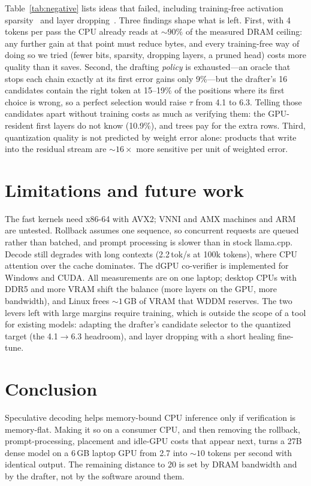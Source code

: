 \documentclass[10pt]{article}
\newcommand{\tps}{tok/s}
\begin{document}
Table~\ref{tab:negative} lists ideas that failed, including training-free activation sparsity~\cite{teal} and
layer dropping~\cite{shortgpt}. Three findings shape what is left. First, with 4 tokens per pass the
CPU already reads at ${\sim}90\%$ of the measured DRAM ceiling: any further gain at that point must reduce bytes, and
every training-free way of doing so we tried (fewer bits, sparsity, dropping layers, a pruned head) costs more quality
than it saves. Second, the drafting \emph{policy} is exhausted---an oracle that stops each chain exactly at its first
error gains only 9\%---but the drafter's 16 candidates contain the right token at 15--19\% of the positions where its
first choice is wrong, so a perfect selection would raise $\tau$ from 4.1 to 6.3. Telling those candidates apart
without training costs as much as verifying them: the GPU-resident first layers do not know (10.9\%), and trees pay for
the extra rows. Third, quantization quality is not predicted by weight error alone: products that write into the
residual stream are ${\sim}16\times$ more sensitive per unit of weighted error.

\section{Limitations and future work}

The fast kernels need x86-64 with AVX2; VNNI and AMX machines and ARM are untested. Rollback assumes one sequence,
so concurrent requests are queued rather than batched, and prompt processing is slower than in stock llama.cpp.
Decode still degrades with long contexts (2.2\,\tps{} at 100k tokens), where CPU attention over the cache
dominates.
The dGPU co-verifier is implemented for Windows and CUDA. All measurements are on one laptop; desktop CPUs with DDR5
and more VRAM shift the balance (more layers on the GPU, more bandwidth), and Linux frees ${\sim}1$\,GB of VRAM
that WDDM reserves. The two levers left with large margins require training, which is outside the scope of a tool
for existing models: adapting the drafter's candidate selector to the quantized target (the 4.1$\to$6.3 headroom), and
layer dropping with a short healing fine-tune.

\section{Conclusion}

Speculative decoding helps memory-bound CPU inference only if verification is memory-flat. Making it so on a
consumer CPU, and then removing the rollback, prompt-processing, placement and idle-GPU costs that appear next,
turns a 27B dense model on a 6\,GB laptop GPU from 2.7 into ${\sim}10$ tokens per second with identical output. The
remaining distance to 20 is set by DRAM bandwidth and by the drafter, not by the software around them.
\end{document}
